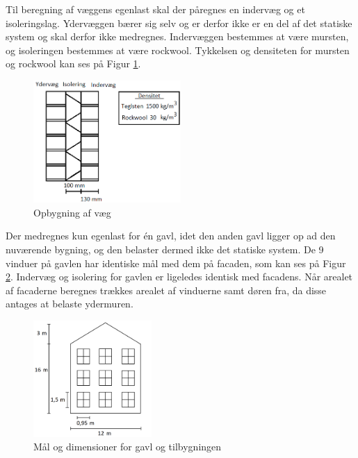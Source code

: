 Til beregning af væggens egenlast skal der påregnes en indervæg og et isoleringslag. Ydervæggen bærer sig selv og er derfor ikke er en del af det statiske system og skal derfor ikke medregnes. Indervæggen bestemmes at være mursten, og isoleringen bestemmes at være rockwool. Tykkelsen og densiteten for mursten og rockwool kan ses på Figur \ref{fig:vaeg}.

\begin{figure}[H]
	\centering
	\includegraphics[width=0.5\textwidth]{billeder/mur.png}
	\caption{Opbygning af væg}
	\label{fig:vaeg}
\end{figure}

Der medregnes kun egenlast for én gavl, idet den anden gavl ligger op ad den nuværende bygning, og den belaster dermed ikke det statiske system. 
\newline \indent{     }  De 9 vinduer på gavlen har identiske mål med dem på facaden, som kan ses på Figur \ref{fig:gavl}. Indervæg og isolering for gavlen er ligeledes identisk med facadens.
\newline \indent{     }  Når arealet af facaderne beregnes trækkes arealet af vinduerne samt døren fra, da disse antages at belaste ydermuren.

\begin{figure}[H]
	\centering
	\includegraphics[width=0.4\textwidth]{billeder/facadevestellerost.png}
	\caption{Mål og dimensioner for gavl og tilbygningen}
	\label{fig:gavl}
\end{figure}

